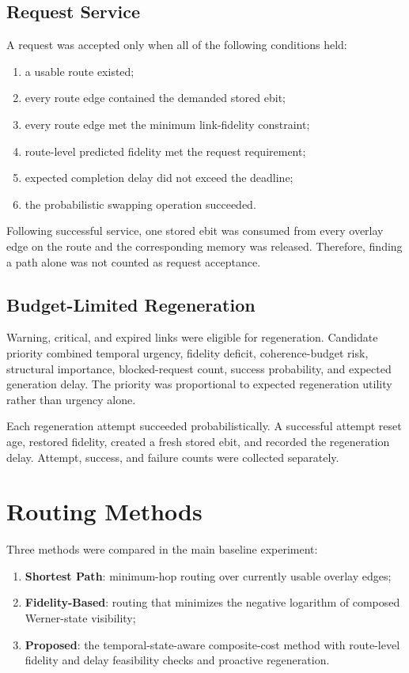 \subsection{Request Service}

A request was accepted only when all of the following conditions held:

\begin{enumerate}
    \item a usable route existed;
    \item every route edge contained the demanded stored ebit;
    \item every route edge met the minimum link-fidelity constraint;
    \item route-level predicted fidelity met the request requirement;
    \item expected completion delay did not exceed the deadline;
    \item the probabilistic swapping operation succeeded.
\end{enumerate}

Following successful service, one stored ebit was consumed from every overlay
edge on the route and the corresponding memory was released. Therefore, finding
a path alone was not counted as request acceptance.

\subsection{Budget-Limited Regeneration}

Warning, critical, and expired links were eligible for regeneration. Candidate
priority combined temporal urgency, fidelity deficit, coherence-budget risk,
structural importance, blocked-request count, success probability, and expected
generation delay. The priority was proportional to expected regeneration
utility rather than urgency alone.

Each regeneration attempt succeeded probabilistically. A successful attempt
reset age, restored fidelity, created a fresh stored ebit, and recorded the
regeneration delay. Attempt, success, and failure counts were collected
separately.

\section{Routing Methods}

Three methods were compared in the main baseline experiment:

\begin{enumerate}
    \item \textbf{Shortest Path}: minimum-hop routing over currently usable
    overlay edges;
    \item \textbf{Fidelity-Based}: routing that minimizes the negative logarithm
    of composed Werner-state visibility;
    \item \textbf{Proposed}: the temporal-state-aware composite-cost method with
    route-level fidelity and delay feasibility checks and proactive
    regeneration.
\end{enumerate}

